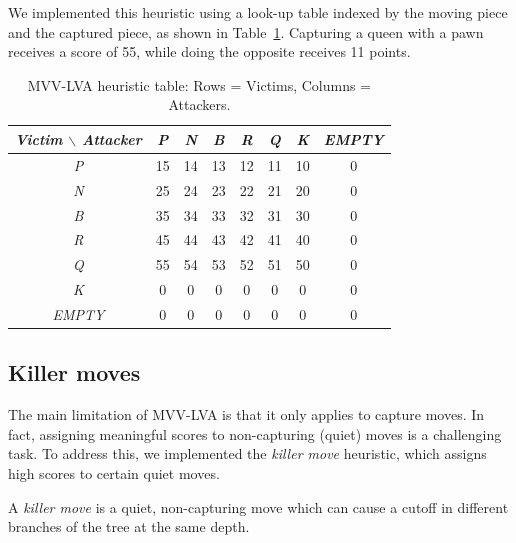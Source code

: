 \vspace{1em}

\noindent We implemented this heuristic using a look-up table indexed by the moving piece and the captured piece, as shown in Table~\ref{tab:mvv-lva-table}. Capturing a queen with a pawn receives a score of 55, while doing the opposite receives 11 points.

\begin{table}[H]
    \centering
    \begin{tabular}{|c|c|c|c|c|c|c|c|}
    \hline
    \textit{Victim $\backslash$ Attacker} & \textit{P} & \textit{N} & \textit{B} & \textit{R} & \textit{Q} & \textit{K} & \textit{EMPTY} \\
    \hline
    \textit{P}     & 15 & 14 & 13 & 12 & 11 & 10 & 0 \\
    \textit{N}     & 25 & 24 & 23 & 22 & 21 & 20 & 0 \\
    \textit{B}     & 35 & 34 & 33 & 32 & 31 & 30 & 0 \\
    \textit{R}     & 45 & 44 & 43 & 42 & 41 & 40 & 0 \\
    \textit{Q}     & 55 & 54 & 53 & 52 & 51 & 50 & 0 \\
    \textit{K}     &  0 &  0 &  0 &  0 &  0 &  0 & 0 \\
    \textit{EMPTY} &  0 &  0 &  0 &  0 &  0 &  0 & 0 \\
    \hline
    \end{tabular}
    \caption{MVV-LVA heuristic table: Rows = Victims, Columns = Attackers.}
    \label{tab:mvv-lva-table}
\end{table}

\subsection*{Killer moves}

The main limitation of MVV-LVA is that it only applies to capture moves. In fact, assigning meaningful scores to non-capturing (quiet) moves is a challenging task. To address this, we implemented the \textit{killer move} heuristic, which assigns high scores to certain quiet moves.

\vspace{1em}

A \textit{killer move} is a quiet, non-capturing move which can cause a cutoff in different branches of the tree at the same depth.~\cite{KillerMoves}

\vspace{1em}

